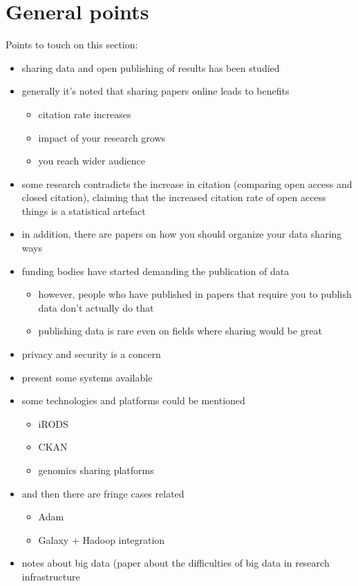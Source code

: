 \section{General points}

Points to touch on this section:

\begin{itemize}
    \item sharing data and open publishing of results has been studied
    \item generally it's noted that sharing papers online leads to benefits
    \begin{itemize}
        \item citation rate increases
        \item impact of your research grows
        \item you reach wider audience
    \end{itemize}
    \item some research contradicts the increase in citation (comparing open
          access and closed citation), claiming that the increased citation
          rate of open access things is a statistical artefact
    \item in addition, there are papers on how you should organize your data
          sharing ways
    \item funding bodies have started demanding the publication of data
    \begin{itemize}
        \item however, people who have published in papers that require you
              to publish data don't actually do that
        \item publishing data is rare even on fields where sharing would be
              great
    \end{itemize}
    \item privacy and security is a concern
    \item present some systems available
    \item some technologies and platforms could be mentioned
    \begin{itemize}
        \item iRODS
        \item CKAN
        \item genomics sharing platforms
    \end{itemize}
    \item and then there are fringe cases related
    \begin{itemize}
        \item Adam
        \item Galaxy + Hadoop integration
    \end{itemize}
    \item notes about big data (paper about the difficulties of big data in
          research infrastructure
\end{itemize}

